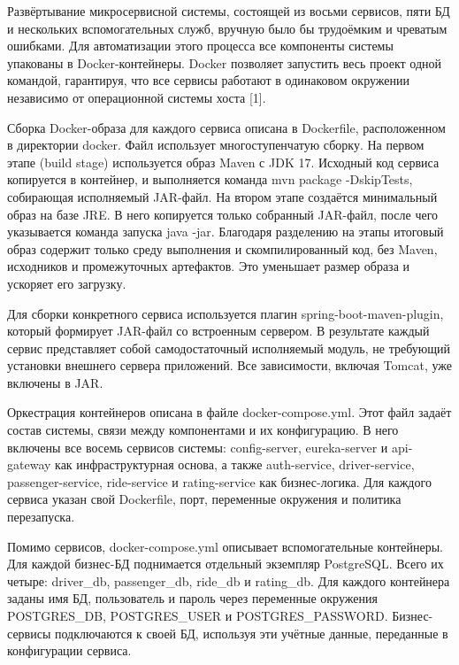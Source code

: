 {\gostFont

\par \redline Развёртывание микросервисной системы, состоящей из восьми сервисов, пяти БД и нескольких вспомогательных служб, вручную было бы трудоёмким и чреватым ошибками. Для автоматизации этого процесса все компоненты системы упакованы в Docker-контейнеры. Docker позволяет запустить весь проект одной командой, гарантируя, что все сервисы работают в одинаковом окружении независимо от операционной системы хоста [1].

\par \redline Сборка Docker-образа для каждого сервиса описана в Dockerfile, расположенном в директории docker. Файл использует многоступенчатую сборку. На первом этапе (build stage) используется образ Maven с JDK 17. Исходный код сервиса копируется в контейнер, и выполняется команда mvn package -DskipTests, собирающая исполняемый JAR-файл. На втором этапе создаётся минимальный образ на базе JRE. В него копируется только собранный JAR-файл, после чего указывается команда запуска java -jar. Благодаря разделению на этапы итоговый образ содержит только среду выполнения и скомпилированный код, без Maven, исходников и промежуточных артефактов. Это уменьшает размер образа и ускоряет его загрузку.

\par \redline Для сборки конкретного сервиса используется плагин spring-boot-maven-plugin, который формирует JAR-файл со встроенным сервером. В результате каждый сервис представляет собой самодостаточный исполняемый модуль, не требующий установки внешнего сервера приложений. Все зависимости, включая Tomcat, уже включены в JAR.

\par \redline Оркестрация контейнеров описана в файле docker-compose.yml. Этот файл задаёт состав системы, связи между компонентами и их конфигурацию. В него включены все восемь сервисов системы: config-server, eureka-server и api-gateway как инфраструктурная основа, а также auth-service, driver-service, passenger-service, ride-service и rating-service как бизнес-логика. Для каждого сервиса указан свой Dockerfile, порт, переменные окружения и политика перезапуска.

\par \redline Помимо сервисов, docker-compose.yml описывает вспомогательные контейнеры. Для каждой бизнес-БД поднимается отдельный экземпляр PostgreSQL. Всего их четыре: driver\_db, passenger\_db, ride\_db и rating\_db. Для каждого контейнера заданы имя БД, пользователь и пароль через переменные окружения POSTGRES\_DB, POSTGRES\_USER и POSTGRES\_PASSWORD. Бизнес-сервисы подключаются к своей БД, используя эти учётные данные, переданные в конфигурации сервиса.

}
